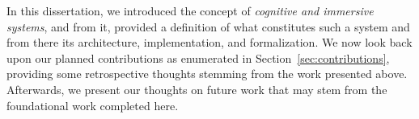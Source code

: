In this dissertation, we introduced the concept of \textit{cognitive and immersive systems}, and from it,
provided a definition of what constitutes such a system and from there its architecture, implementation,
and formalization. We now look back upon our planned contributions as enumerated in Section~\ref{sec:contributions},
providing some retrospective thoughts stemming from the work presented above. Afterwards, we present our
thoughts on future work that may stem from the foundational work completed here.